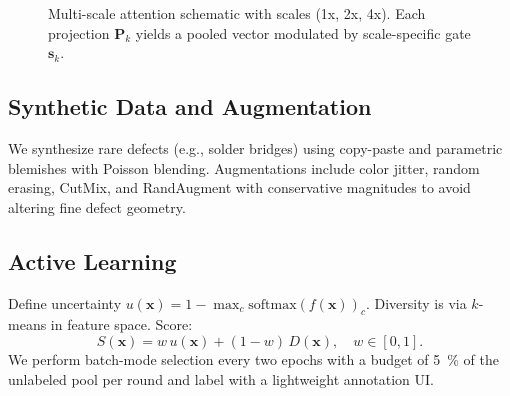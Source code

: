 \documentclass[conference]{IEEEtran}
\begin{document}
\begin{figure}[!t]
  \centering
  \caption{Multi-scale attention schematic with scales (1x, 2x, 4x). Each projection $\mathbf{P}_k$ yields a pooled vector modulated by scale-specific gate $\mathbf{s}_k$.}
  \label{fig:msa_schematic}
\end{figure}

\subsection{Synthetic Data and Augmentation}
We synthesize rare defects (e.g., solder bridges) using copy-paste and parametric blemishes with Poisson blending. Augmentations include color jitter, random erasing, CutMix, and RandAugment with conservative magnitudes to avoid altering fine defect geometry.

\subsection{Active Learning}
Define uncertainty $u(\mathbf{x}) = 1 - \max_c \text{softmax}(f(\mathbf{x}))_c$. Diversity is via $k$-means in feature space. Score:
\begin{equation}
S(\mathbf{x}) = w\, u(\mathbf{x}) + (1-w)\, D(\mathbf{x}), \quad w \in [0,1].
\end{equation}
We perform batch-mode selection every two epochs with a budget of \SI{5}{\percent} of the unlabeled pool per round and label with a lightweight annotation UI.
\end{document}
